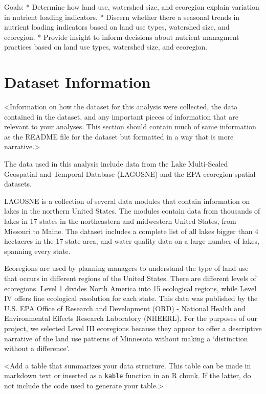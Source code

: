 \documentclass[12pt,]{article}
\begin{document}
Goals: * Determine how land use, watershed size, and ecoregion explain
variation in nutrient loading indicators. * Discern whether there a
seasonal trends in nutrient loading indicators based on land use types,
watershed size, and ecoregion. * Provide insight to inform decisions
about nutrient managment practices based on land use types, watershed
size, and ecoregion.

\newpage

\hypertarget{dataset-information}{%
\section{Dataset Information}\label{dataset-information}}

\textless{}Information on how the dataset for this analysis were
collected, the data contained in the dataset, and any important pieces
of information that are relevant to your analyses. This section should
contain much of same information as the README file for the dataset but
formatted in a way that is more narrative.\textgreater{}

The data used in this analysis include data from the Lake Multi-Scaled
Geospatial and Temporal Database (LAGOSNE) and the EPA ecoregion spatial
datasets.

LAGOSNE is a collection of several data modules that contain information
on lakes in the northern United States. The modules contain data from
thousands of lakes in 17 states in the northeastern and midwestern
United States, from Missouri to Maine. The dataset includes a complete
list of all lakes bigger than 4 hectacres in the 17 state area, and
water quality data on a large number of lakes, spanning every state.

Ecoregions are used by planning managers to understand the type of land
use that occurs in different regions of the United States. There are
different levels of ecoregions. Level 1 divides North America into 15
ecological regions, while Level IV offers fine ecological resolution for
each state. This data was published by the U.S. EPA Office of Research
and Development (ORD) - National Health and Environmental Effects
Research Laboratory (NHEERL). For the purposes of our project, we
selected Level III ecoregions because they appear to offer a descriptive
narrative of the land use patterns of Minnesota without making a
`distinction without a difference'.

\textless{}Add a table that summarizes your data structure. This table
can be made in markdown text or inserted as a \texttt{kable} function in
an R chunk. If the latter, do not include the code used to generate your
table.\textgreater{}
\end{document}
